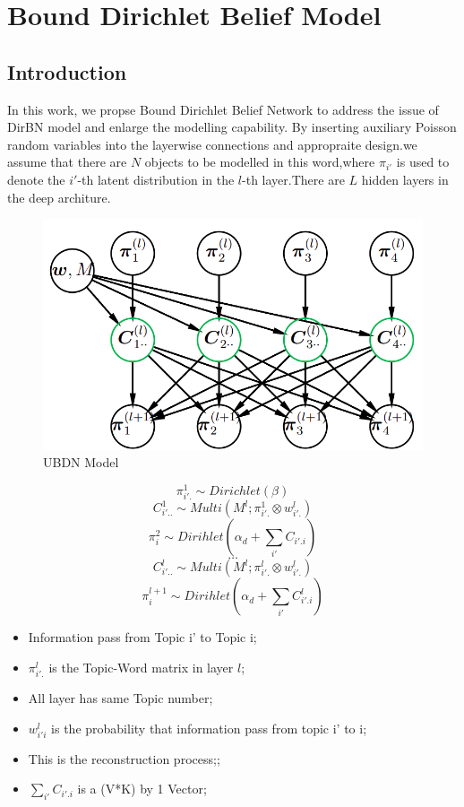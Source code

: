 \chapter{Bound Dirichlet Belief Model}\label{ccl}

\section{Introduction}
In this work, we propse Bound Dirichlet Belief Network to address the issue of DirBN model and enlarge the modelling capability. By inserting auxiliary Poisson random variables into the  layerwise connections and appropraite design.we assume that there are $N$ objects to be modelled in this word,where $\pi_{i'}$ is used to denote the $i'$-th latent distribution in the $l$-th layer.There are $L$ hidden layers in the deep architure.


\begin{figure}
\includegraphics[width = \linewidth]{ubdn.png}
\caption{UBDN Model}
\label{fig:DirBN Model}
\end{figure}

$$ \pi_{i'.}^1 \sim Dirichlet(\beta) $$
$$C_{i'..}^{1} \sim Multi(M^l;\pi_{i'.}^1 \otimes w_{i'.}^l) \tag{1}$$
$$\pi_{i}^{2} \sim Dirihlet(\alpha_d +\sum_{i'}{C_{i'.i}})\tag{2}$$
$$\dots$$
$$C_{i'..}^{l} \sim Multi(M^l;\pi_{i'.}^l \otimes w_{i'.}^l) \tag{1}$$
$$\pi_{i}^{l+1} \sim Dirihlet(\alpha_d +\sum_{i'}{C_{i'.i}^l})\tag{2}$$
\begin{itemize}
  \item Information pass from Topic i' to Topic i;
  \item $\pi_{i'.}^l$ is the Topic-Word matrix in layer $l$;
  \item All layer has same Topic number;
  \item $w_{i'i}^l$ is the probability that information pass from topic i' to i;
  \item This is the reconstruction process;;
  \item  $\sum_{i'}{C_{i'.i}}$  is a (V*K) by 1 Vector;
\end{itemize}

